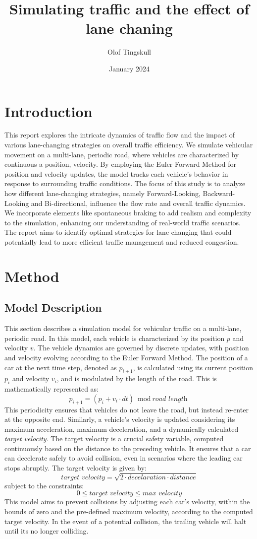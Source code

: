 \documentclass{article}
\title{Simulating traffic and the effect of lane chaning}
\author{Olof Tingskull}
\date{January 2024}
\begin{document}
\maketitle

\section{Introduction}
This report explores the intricate dynamics of traffic flow and the impact of various lane-changing strategies on overall traffic efficiency. We simulate vehicular movement on a multi-lane, periodic road, where vehicles are characterized by continuous a position,  velocity. By employing the Euler Forward Method for position and velocity updates, the model tracks each vehicle's behavior in response to surrounding traffic conditions. The focus of this study is to analyze how different lane-changing strategies, namely Forward-Looking, Backward-Looking and Bi-directional, influence the flow rate and overall traffic dynamics. We incorporate elements like spontaneous braking to add realism and complexity to the simulation, enhancing our understanding of real-world traffic scenarios. The report aims to identify optimal strategies for lane changing that could potentially lead to more efficient traffic management and reduced congestion.

\section{Method}

\subsection{Model Description}
This section describes a simulation model for vehicular traffic on a multi-lane, periodic road. In this model, each vehicle is characterized by its position $p$ and velocity $v$. The vehicle dynamics are governed by discrete updates, with position and velocity evolving according to the Euler Forward Method. The position of a car at the next time step, denoted as $p_{i+1}$, is calculated using its current position $p_i$ and velocity $v_i$, and is modulated by the length of the road. This is mathematically represented as:$$p_{i+1} = (p_i + v_i \cdot dt) \bmod \textit{road length}$$ This periodicity ensures that vehicles do not leave the road, but instead re-enter at the opposite end. Similarly, a vehicle's velocity is updated considering its maximum acceleration, maximum deceleration, and a dynamically calculated \textit{target velocity}. The target velocity is a crucial safety variable, computed continuously based on the distance to the preceding vehicle. It ensures that a car can decelerate safely to avoid collision, even in scenarios where the leading car stops abruptly. The target velocity is given by:
$$\textit{target velocity} = \sqrt{2 \cdot decelaration \cdot distance}  $$
subject to the constraints:
$$ 0 \leq \textit{target velocity} \leq \textit{max velocity}$$
This model aims to prevent collisions by adjusting each car's velocity, within the bounds of zero and the pre-defined maximum velocity, according to the computed target velocity. In the event of a potential collision, the trailing vehicle will halt until its no longer colliding.
\end{document}
